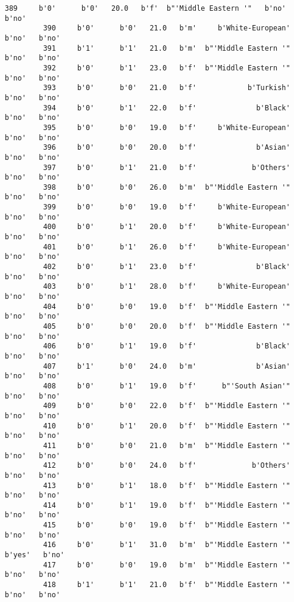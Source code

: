 \documentclass[11pt]{article}
\begin{document}
\begin{Verbatim}[commandchars=\\\{\}]
         389     b'0'      b'0'   20.0   b'f'  b"'Middle Eastern '"   b'no'   b'no'   
         390     b'0'      b'0'   21.0   b'm'     b'White-European'   b'no'   b'no'   
         391     b'1'      b'1'   21.0   b'm'  b"'Middle Eastern '"   b'no'   b'no'   
         392     b'0'      b'1'   23.0   b'f'  b"'Middle Eastern '"   b'no'   b'no'   
         393     b'0'      b'0'   21.0   b'f'            b'Turkish'   b'no'   b'no'   
         394     b'0'      b'1'   22.0   b'f'              b'Black'   b'no'   b'no'   
         395     b'0'      b'0'   19.0   b'f'     b'White-European'   b'no'   b'no'   
         396     b'0'      b'0'   20.0   b'f'              b'Asian'   b'no'   b'no'   
         397     b'0'      b'1'   21.0   b'f'             b'Others'   b'no'   b'no'   
         398     b'0'      b'0'   26.0   b'm'  b"'Middle Eastern '"   b'no'   b'no'   
         399     b'0'      b'0'   19.0   b'f'     b'White-European'   b'no'   b'no'   
         400     b'0'      b'1'   20.0   b'f'     b'White-European'   b'no'   b'no'   
         401     b'0'      b'1'   26.0   b'f'     b'White-European'   b'no'   b'no'   
         402     b'0'      b'1'   23.0   b'f'              b'Black'   b'no'   b'no'   
         403     b'0'      b'1'   28.0   b'f'     b'White-European'   b'no'   b'no'   
         404     b'0'      b'0'   19.0   b'f'  b"'Middle Eastern '"   b'no'   b'no'   
         405     b'0'      b'0'   20.0   b'f'  b"'Middle Eastern '"   b'no'   b'no'   
         406     b'0'      b'1'   19.0   b'f'              b'Black'   b'no'   b'no'   
         407     b'1'      b'0'   24.0   b'm'              b'Asian'   b'no'   b'no'   
         408     b'0'      b'1'   19.0   b'f'      b"'South Asian'"   b'no'   b'no'   
         409     b'0'      b'0'   22.0   b'f'  b"'Middle Eastern '"   b'no'   b'no'   
         410     b'0'      b'1'   20.0   b'f'  b"'Middle Eastern '"   b'no'   b'no'   
         411     b'0'      b'0'   21.0   b'm'  b"'Middle Eastern '"   b'no'   b'no'   
         412     b'0'      b'0'   24.0   b'f'             b'Others'   b'no'   b'no'   
         413     b'0'      b'1'   18.0   b'f'  b"'Middle Eastern '"   b'no'   b'no'   
         414     b'0'      b'1'   19.0   b'f'  b"'Middle Eastern '"   b'no'   b'no'   
         415     b'0'      b'0'   19.0   b'f'  b"'Middle Eastern '"   b'no'   b'no'   
         416     b'0'      b'1'   31.0   b'm'  b"'Middle Eastern '"  b'yes'   b'no'   
         417     b'0'      b'0'   19.0   b'm'  b"'Middle Eastern '"   b'no'   b'no'   
         418     b'1'      b'1'   21.0   b'f'  b"'Middle Eastern '"   b'no'   b'no'   

\end{Verbatim}
\end{document}
